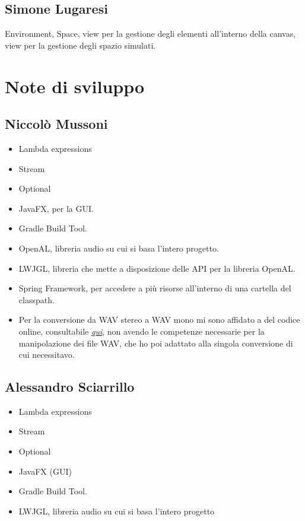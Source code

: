 \documentclass[a4paper,12pt]{report}
\begin{document}
\subsection*{Simone Lugaresi}
Environment, Space, view per la gestione degli elementi all'interno della canvas, view per la gestione degli spazio simulati.
\section{Note di sviluppo}
\subsection*{Niccolò Mussoni}
\begin{itemize}
	\item Lambda expressions
	\item Stream
	\item Optional
	\item JavaFX, per la GUI.
	\item Gradle Build Tool.
	\item OpenAL, libreria audio su cui si basa l’intero progetto.
	\item LWJGL, libreria che mette a disposizione delle API per la libreria OpenAL.
	\item Spring Framework, per accedere a più risorse all'interno di una cartella del classpath.
	\item Per la conversione da WAV stereo a WAV mono mi sono affidato a del codice online, consultabile \textit{\underline{\href{http://www.java2s.com/example/java/javax.sound.sampled/converts-re-samples-and-mono-tofrom-stereo-audio-data.html}{qui}}}, non avendo le competenze necessarie per la manipolazione dei file WAV, che ho poi adattato alla singola conversione di cui necessitavo.
\end{itemize}
\subsection*{Alessandro Sciarrillo}
\begin{itemize}
	\item Lambda expressions
	\item Stream
	\item Optional
	\item JavaFX (GUI)
	\item Gradle Build Tool.
	\item LWJGL, libreria audio su cui si basa l’intero progetto
\end{itemize}
\end{document}
